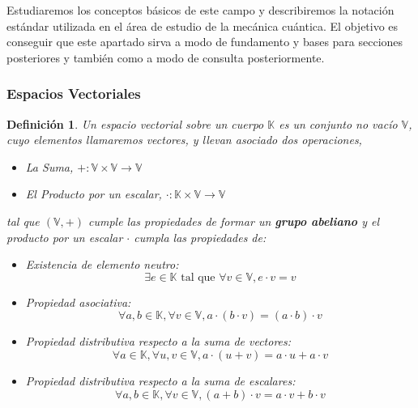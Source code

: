 \documentclass[a4paper]{article}
\newtheorem{deff}{Definición}[section]
\numberwithin{equation}{section}
\begin{document}
Estudiaremos los conceptos básicos de este campo y describiremos la notación estándar utilizada en el área de estudio de la mecánica cuántica. El objetivo es conseguir que este apartado sirva a modo de fundamento y bases para secciones posteriores y también como a modo de consulta posteriormente.

\subsubsection{Espacios Vectoriales}


\begin{deff}

Un espacio vectorial sobre un cuerpo $\mathbb{K}$ es un conjunto no vacío $\mathbb{V}$, cuyo elementos llamaremos vectores, y llevan asociado dos operaciones, 
\begin{itemize}

\item La Suma, $\textbf{+}: \mathbb{V} \times \mathbb{V} \longrightarrow \mathbb{V}$

\item El Producto por un escalar, $\textbf{$\cdot$}:\mathbb{K} \times \mathbb{V} \longrightarrow \mathbb{V}$

\end{itemize}
tal que $(\mathbb{V},+)$ cumple las propiedades de formar un \textbf{grupo abeliano} y el producto por un escalar $\cdot$ cumpla las propiedades de:
\begin{itemize}

\item Existencia de elemento neutro:
\begin{equation}
\exists e \in \mathbb{K} \text{ tal que } \forall v \in \mathbb{V},  e \cdot v = v
\end{equation}

\item Propiedad asociativa:
\begin{equation}
\forall a, b \in \mathbb{K}, \forall v \in \mathbb{V}, a\cdot(b\cdot v) = (a\cdot b)\cdot v
\end{equation}

\item Propiedad distributiva respecto a la suma de vectores:
\begin{equation}
\forall a \in \mathbb{K}, \forall u, v \in \mathbb{V}, a\cdot(u + v) = a\cdot u + a\cdot v
\end{equation}

\item Propiedad distributiva respecto a la suma de escalares:
\begin{equation}
\forall a, b \in \mathbb{K}, \forall v \in \mathbb{V}, (a + b)\cdot v = a\cdot v + b\cdot v
\end{equation}

\end{itemize}

\end{deff}
\end{document}
